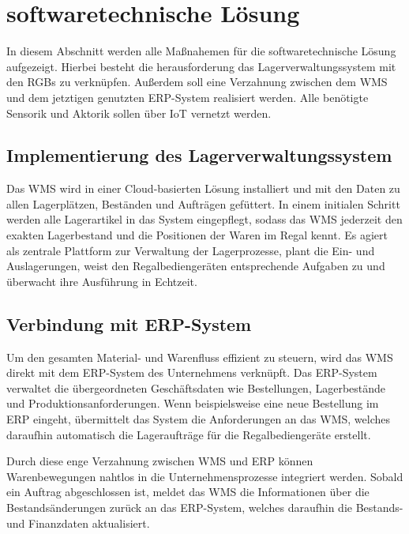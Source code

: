 \section{softwaretechnische Lösung}
In diesem Abschnitt werden alle Maßnahemen für die softwaretechnische Lösung aufgezeigt. Hierbei besteht die herausforderung das Lagerverwaltungssystem mit den RGBs zu verknüpfen. Außerdem soll eine Verzahnung zwischen dem WMS und dem jetztigen genutzten ERP-System realisiert werden. Alle benötigte Sensorik und Aktorik sollen über IoT vernetzt werden.
\subsection{Implementierung des Lagerverwaltungssystem}
Das WMS wird in einer Cloud-basierten Lösung installiert und mit den Daten zu allen Lagerplätzen, Beständen und Aufträgen gefüttert. In einem initialen Schritt werden alle Lagerartikel in das System eingepflegt, sodass das WMS jederzeit den exakten Lagerbestand und die Positionen der Waren im Regal kennt. Es agiert als zentrale Plattform zur Verwaltung der Lagerprozesse, plant die Ein- und Auslagerungen, weist den Regalbediengeräten entsprechende Aufgaben zu und überwacht ihre Ausführung in Echtzeit.

\subsection{Verbindung mit ERP-System}
Um den gesamten Material- und Warenfluss effizient zu steuern, wird das WMS direkt mit dem ERP-System des Unternehmens verknüpft. Das ERP-System verwaltet die übergeordneten Geschäftsdaten wie Bestellungen, Lagerbestände und Produktionsanforderungen. Wenn beispielsweise eine neue Bestellung im ERP eingeht, übermittelt das System die Anforderungen an das WMS, welches daraufhin automatisch die Lageraufträge für die Regalbediengeräte erstellt.

Durch diese enge Verzahnung zwischen WMS und ERP können Warenbewegungen nahtlos in die Unternehmensprozesse integriert werden. Sobald ein Auftrag abgeschlossen ist, meldet das WMS die Informationen über die Bestandsänderungen zurück an das ERP-System, welches daraufhin die Bestands- und Finanzdaten aktualisiert.



